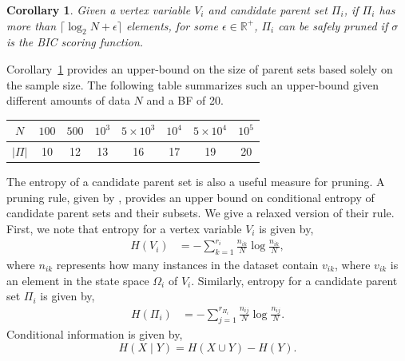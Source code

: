 \documentclass[letterpaper]{article}
\newcommand{\vertex}[1]{V_{#1}}
\newcommand{\parents}{\Pi}
\newcommand{\ceil}[1]{\lceil #1 \rceil}
\newtheorem{corollary}{Corollary}
\begin{document}



\begin{corollary}
	Given a vertex variable $\vertex{i}$ and candidate parent set 
	$\Pi_i$, if $\Pi_i$ has more than $\ceil{\log_2 N + \epsilon}$ elements, for some $\epsilon \in \mathbb{R}^+$, $\Pi_i$ can be safely pruned if $\sigma$ is the BIC scoring function. \label{cor:decampossizerelaxed}
	\end{corollary}
	
Corollary~\ref{cor:decampossizerelaxed} provides an upper-bound on the size of parent sets based solely on the sample size. The following table summarizes such an upper-bound given different amounts of data $N$ and a BF of 20.
\begin{table}[ht]
    \centering
    \begin{tabular}{@{}c||ccccccc@{}}
     $N$ & $100$ & $500$ & $10^{3}$ & $5\times10^{3}$ & $10^{4}$ & $5\times10^{4}$ & $10^{5}$ \\\hline
     $|\parents|$ & 10 & 12 & 13 & 16 & 17 & 19 & 20
    \end{tabular}
    \label{tab:paLim}
\end{table}

The entropy of a candidate parent set is also a useful measure for pruning. A pruning rule, given by \cite{Campos2017}, provides an upper bound on conditional entropy of candidate parent sets and their subsets. We give a relaxed version of their rule. First, we note that entropy for a vertex variable $\vertex{i}$ is given by,
\begin{align*}
    H(\vertex{i}) &=  -\sum^{r_i}_{k=1}\frac{n_{ik}}{N}\log \frac{n_{ik}}{N} ,
\end{align*}
where $n_{ik}$ represents how many instances in the dataset contain $v_{ik}$, where $v_{ik}$ is an element in the state space $\Omega_i$ of $\vertex{i}$. Similarly, entropy for a candidate parent set $\Pi_i$ is given by,
\begin{align*}
    H(\Pi_i) &=  -\sum^{r_{\Pi_i}}_{j=1}\frac{n_{ij}}{N}\log \frac{n_{ij}}{N} .
\end{align*}
Conditional information is given by,
\begin{equation*}
    H(X \mid Y ) = H(X \cup Y) - H(Y) .
\end{equation*}
\end{document}

